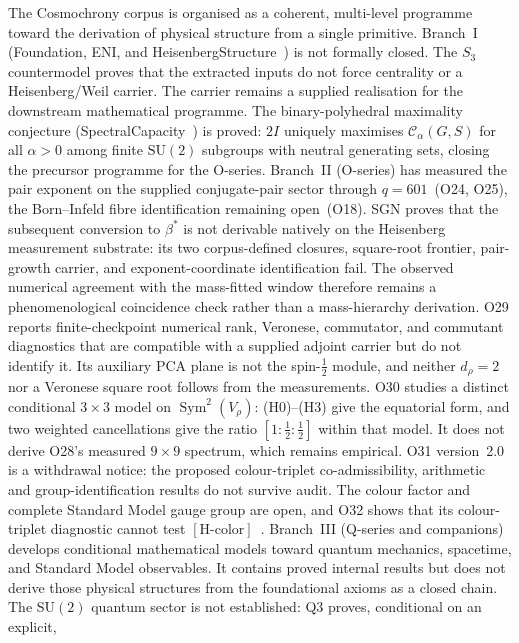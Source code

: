 \documentclass[11pt,a4paper]{article}
\newcommand{\SU}{\mathrm{SU}}
\begin{document}
  The Cosmochrony corpus is organised as a coherent, multi-level programme toward the derivation of
  physical structure from a single primitive.
  Branch~I (Foundation, ENI, and HeisenbergStructure~\cite{Beau2026HeisenbergStructure})
  is not formally closed.
  The \(S_3\) countermodel proves that the extracted inputs do not force centrality or a
  Heisenberg/Weil carrier.
  The carrier remains a supplied realisation for the downstream mathematical programme.
  The binary-polyhedral maximality conjecture (SpectralCapacity~\cite{Beau2026a2}) is proved:
  $2I$ uniquely maximises $\mathcal{C}_\alpha(G,S)$ for all $\alpha > 0$ among finite $\SU(2)$ subgroups
  with neutral generating sets, closing the precursor programme for the O-series.
  Branch~II (O-series) has measured the pair exponent on the supplied conjugate-pair sector
  through $q=601$~(O24, O25), the Born--Infeld fibre identification remaining open~(O18).
  SGN proves that the subsequent conversion to $\beta^*$ is not derivable natively on the
  Heisenberg measurement substrate: its two corpus-defined closures, square-root frontier,
  pair-growth carrier, and exponent-coordinate identification fail.
  The observed numerical agreement with the mass-fitted window therefore remains a
  phenomenological coincidence check rather than a mass-hierarchy derivation.
  O29 reports finite-checkpoint numerical rank, Veronese, commutator, and commutant diagnostics that
  are compatible with a supplied adjoint carrier but do not identify it. Its auxiliary PCA plane is
  not the spin-$\tfrac12$ module, and neither $d_\rho=2$ nor a Veronese square root follows from the
  measurements.
  O30 studies a distinct conditional $3\times3$ model on $\operatorname{Sym}^2(V_\rho)$: (H0)--(H3)
  give the equatorial form, and two weighted cancellations give the ratio
  $[1:\tfrac12:\tfrac12]$ within that model. It does not derive O28's measured $9\times9$ spectrum,
  which remains empirical.
  O31 version~2.0 is a withdrawal notice: the proposed colour-triplet co-admissibility,
  arithmetic and group-identification results do not survive audit. The colour factor and complete
  Standard Model gauge group are open, and O32 shows that its colour-triplet diagnostic cannot test
  $[\mathrm{H\text{-}color}]$~\cite{Beau2026a35,Beau2026a36}.
  Branch~III (Q-series and companions) develops conditional mathematical models toward quantum
  mechanics, spacetime, and Standard Model observables. It contains proved internal results but
  does not derive those physical structures from the foundational axioms as a closed chain.
  The $\SU(2)$ quantum sector is not established: Q3 proves, conditional on an explicit,
\end{document}
